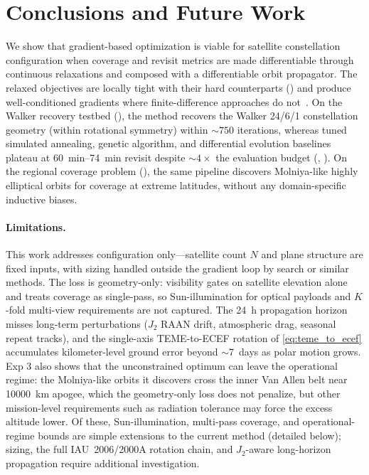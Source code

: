 \section{Conclusions and Future Work}
\label{sec:conclusion}

We show that gradient-based optimization is viable for satellite constellation configuration when coverage and revisit metrics are made differentiable through continuous relaxations and composed with a differentiable orbit propagator.
The relaxed objectives are locally tight with their hard counterparts () and produce well-conditioned gradients where finite-difference approaches do not~\citep{paek_optimization_2019}.
On the Walker recovery testbed (), the method recovers the Walker 24/6/1 constellation geometry (within rotational symmetry) within ${\sim}750$ iterations, whereas tuned simulated annealing, genetic algorithm, and differential evolution baselines plateau at \SI{60}{\minute}--\SI{74}{\minute} revisit despite ${\sim}4\times$ the evaluation budget (, ).
On the regional coverage problem (), the same pipeline discovers Molniya-like highly elliptical orbits for coverage at extreme latitudes, without any domain-specific inductive biases.

\paragraph{Limitations.}
This work addresses configuration only---satellite count $N$ and plane structure are fixed inputs, with sizing handled outside the gradient loop by search or similar methods. The loss is geometry-only: visibility gates on satellite elevation alone and treats coverage as single-pass, so Sun-illumination for optical payloads and $K$-fold multi-view requirements are not captured. The \SI{24}{\hour} propagation horizon misses long-term perturbations ($J_2$ RAAN drift, atmospheric drag, seasonal repeat tracks), and the single-axis TEME-to-ECEF rotation of \eqref{eq:teme_to_ecef} accumulates kilometer-level ground error beyond ${\sim}$\SI{7}{days} as polar motion grows. Exp 3 also shows that the unconstrained optimum can leave the operational regime: the Molniya-like orbits it discovers cross the inner Van Allen belt near \SI{10000}{\kilo\metre} apogee, which the geometry-only loss does not penalize, but other mission-level requirements such as radiation tolerance may force the excess altitude lower. Of these, Sun-illumination, multi-pass coverage, and operational-regime bounds are simple extensions to the current method (detailed below); sizing, the full IAU~2006/2000A rotation chain, and $J_2$-aware long-horizon propagation require additional investigation.

